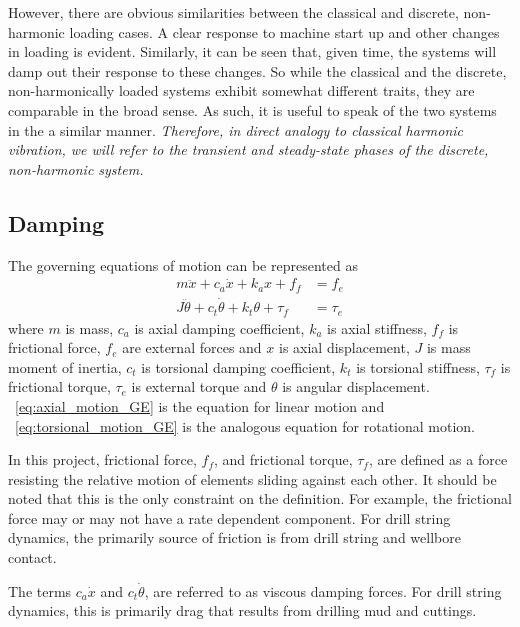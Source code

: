 However, there are obvious similarities between the classical and discrete, non-harmonic loading cases.  A clear response to machine start up and other changes in loading is evident.  Similarly, it can be seen that, given time, the systems will damp out their response to these changes. So while the classical and the discrete, non-harmonically loaded systems exhibit somewhat different traits, they are comparable in the broad sense.  As such, it is useful to speak of the two systems in the a similar manner.  \emph{Therefore, in direct analogy to classical harmonic vibration, we will refer to the transient and steady-state phases of the discrete, non-harmonic system.}

\subsection{Damping}
The governing equations of motion can be represented as
\begin{align}
    m\ddot{x}      + c_a\dot{x}      + k_ax      + f_f    & = f_e    \label{eq:axial_motion_GE} \\
    J\ddot{\theta} + c_t\dot{\theta} + k_t\theta + \tau_f & = \tau_e \label{eq:torsional_motion_GE}
\end{align}
where $m$ is mass, $c_a$ is axial damping coefficient, $k_a$ is axial stiffness, $f_f$ is frictional force, $f_e$ are external forces and $x$ is axial displacement, $J$ is mass moment of inertia, $c_t$ is torsional damping coefficient, $k_t$ is torsional stiffness, $\tau_f$ is frictional torque, $\tau_e$ is external torque and $\theta$ is angular displacement.  \equationname~\ref{eq:axial_motion_GE} is the equation for linear motion and \equationname~\ref{eq:torsional_motion_GE} is the analogous equation for rotational motion.

In this project, frictional force, $f_f$, and frictional torque, $\tau_f$, are defined as a force resisting the relative motion of elements sliding against each other.  It should be noted that this is the only constraint on the definition.  For example, the frictional force may or may not have a rate dependent component.  For drill string dynamics, the primarily source of friction is from drill string and wellbore contact.


The terms $c_a\dot{x}$ and $c_t\dot{\theta}$, are referred to as viscous damping forces.  For drill string dynamics, this is primarily drag that results from drilling mud and cuttings.

